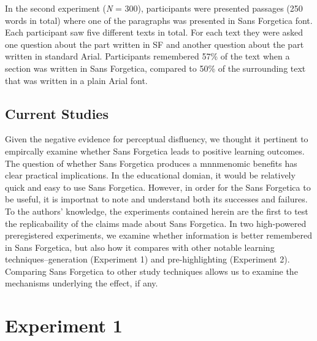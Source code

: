 \documentclass[doc]{apa6}
\begin{document}
In the second experiment (\emph{N} = 300), participants were presented passages (250 words in total) where one of the paragraphs was presented in Sans Forgetica font. Each participant saw five different texts in total. For each text they were asked one question about the part written in SF and another question about the part written in standard Arial. Participants remembered 57\% of the text when a section was written in Sans Forgetica, compared to 50\% of the surrounding text that was written in a plain Arial font.

\hypertarget{current-studies}{%
\subsection{Current Studies}\label{current-studies}}

Given the negative evidence for perceptual disfluency, we thought it pertinent to empircally examine whether Sans Forgetica leads to positive learning outcomes. The question of whether Sans Forgetica produces a mnnmenomic benefits has clear practical implications. In the educational domian, it would be relatively quick and easy to use Sans Forgetica. However, in order for the Sans Forgetica to be useful, it is importnat to note and understand both its successes and failures. To the authors' knowledge, the experiments contained herein are the first to test the replicabaility of the claims made about Sans Forgetica. In two high-powered preregistered experiments, we examine whether information is better remembered in Sans Forgetica, but also how it compares with other notable learning techniques--generation (Experiment 1) and pre-highlighting (Experiment 2). Comparing Sans Forgetica to other study techniques allows us to examine the mechanisms underlying the effect, if any.

\hypertarget{experiment-1}{%
\section{Experiment 1}\label{experiment-1}}
\end{document}
